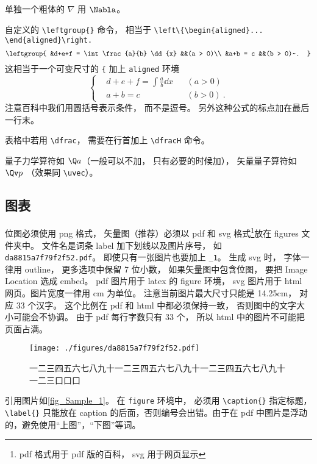 单独一个粗体的 $\nabla$ 用 $\Nabla$。

自定义的 \verb|\leftgroup{}| 命令， 相当于 \verb|\left\{\begin{aligned}... \end{aligned}\right.|
\begin{equation}
\leftgroup{
&d+e+f = \int \frac{a}{b} \dd{x} &&(a > 0)\\
&a+b = c &&(b > 0)~.
}
\end{equation}
这相当于一个可变尺寸的 \verb|{| 加上 \verb|aligned| 环境
\begin{equation}
\left\{
\begin{aligned}
&d+e+f = \int \frac{a}{b} \dd{x} &&(a > 0)\\
&a+b = c &&(b > 0)~.
\end{aligned}
\right.
\end{equation}
注意百科中我们用圆括号表示条件， 而不是逗号。 另外这种公式的标点加在最后一行末。

表格中若用 \verb|\dfrac|， 需要在行首加上 \verb|\dfracH| 命令。%

量子力学算符如 $\Q a$（一般可以不加， 只有必要的时候加）， 矢量量子算符如 $\Qv p$ （效果同 \verb|\uvec|）。

\subsection{图表}

位图必须使用 png 格式， 矢量图（推荐）必须以 pdf 和 svg 格式\footnote{pdf 格式用于 pdf 版的百科， svg 用于网页显示}放在 figures 文件夹中。 文件名是词条 label 加下划线以及图片序号， 如 \verb|da8815a7f79f2f52.pdf|。 即使只有一张图片也要加上 \verb|_1|。 生成 svg 时， 字体一律用 outline， 更多选项中保留 7 位小数， 如果矢量图中包含位图， 要把 Image Location 选成 embed。 pdf 图片用于 latex 的 figure 环境， svg 图片用于 html 网页。图片宽度一律用 cm 为单位。 注意当前图片最大尺寸只能是 14.25cm， 对应 33 个汉字。 这个比例在 pdf 和 html 中都必须保持一致， 否则图中的文字大小可能会不协调。 由于 pdf 每行字数只有 33 个， 所以 html 中的图片不可能把页面占满。
\begin{figure}[ht]
\centering
\texttt{[image: ./figures/da8815a7f79f2f52.pdf]}
\caption{一二三四五六七八九十一二三四五六七八九十一二三四五六七八九十一二三口口口} \label{fig_Sample_1}
\end{figure}
引用图片如\autoref{fig_Sample_1}。 在 \verb|figure| 环境中， 必须用 \verb|\caption{}| 指定标题， \verb|\label{}| 只能放在 caption 的后面，否则编号会出错。由于在 pdf 中图片是浮动的，避免使用“上图”，“下图”等词。

